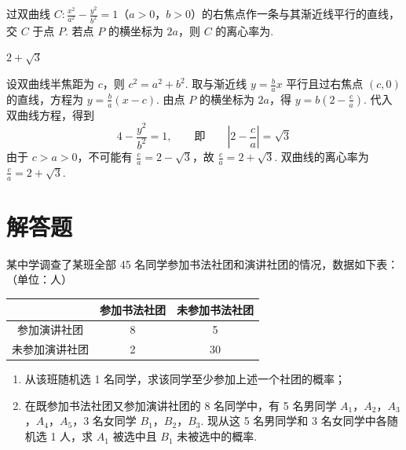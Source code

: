 \begin{problem}
过双曲线 \(C: \frac{x^2}{a^2} - \frac{y^2}{b^2} = 1\)（\(a > 0\)，\(b > 0\)）的右焦点作一条与其渐近线平行的直线，交 \(C\) 于点 \(P\). 若点 \(P\) 的横坐标为 \(2a\)，则 \(C\) 的离心率为\fillinblank{}.
\end{problem}

\begin{answer}
\(2 + \sqrt{3}\)
\end{answer}

\begin{solution}
设双曲线半焦距为 \(c\)，则 \(c^2=a^2+b^2\). 取与渐近线 \(y=\frac ba x\) 平行且过右焦点 \((c,0)\) 的直线，方程为
\(y=\frac ba(x-c)\). 由点 \(P\) 的横坐标为 \(2a\)，得 \(y=b\left(2-\frac ca\right)\). 代入双曲线方程，得到
\[
4-\frac{y^2}{b^2}=1,\qquad\text{即}\qquad
\left|2-\frac ca\right|=\sqrt3
\]
由于 \(c>a>0\)，不可能有 \(\frac ca=2-\sqrt3\)，故 \(\frac ca=2+\sqrt3\). 双曲线的离心率为 \(\frac ca=2+\sqrt3\).
\end{solution}

\section{解答题}

\begin{problem}
某中学调查了某班全部 45 名同学参加书法社团和演讲社团的情况，数据如下表：（单位：人）

\begin{center}
\begin{tabular}{|c|c|c|}
\hline
 & 参加书法社团 & 未参加书法社团 \\
\hline
参加演讲社团 & 8 & 5 \\
\hline
未参加演讲社团 & 2 & 30 \\
\hline
\end{tabular}
\end{center}

\begin{enumerate}
\item 从该班随机选 1 名同学，求该同学至少参加上述一个社团的概率；
\item 在既参加书法社团又参加演讲社团的 8 名同学中，有 5 名男同学 \(A_{1}\)，\(A_{2}\)，\(A_{3}\)，\(A_{4}\)，\(A_{5}\)，3 名女同学 \(B_{1}\)，\(B_{2}\)，\(B_{3}\). 现从这 5 名男同学和 3 名女同学中各随机选 1 人，求 \(A_{1}\) 被选中且 \(B_{1}\) 未被选中的概率.
\end{enumerate}
\end{problem}

